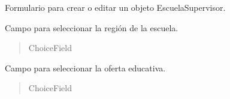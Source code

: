 \documentclass[letterpaper,10pt,spanish]{sphinxmanual}
\begin{document}
\begin{fulllineitems}

\pysigstartsignatures
{}
\pysigstopsignatures
\sphinxAtStartPar
Formulario para crear o editar un objeto EscuelaSupervisor.


\begin{fulllineitems}

\pysigstartsignatures
{}
\pysigstopsignatures
\sphinxAtStartPar
Campo para seleccionar la región de la escuela.
\begin{quote}\begin{description}
\sphinxAtStartPar
ChoiceField

\end{description}\end{quote}

\end{fulllineitems}



\begin{fulllineitems}

\pysigstartsignatures
{}
\pysigstopsignatures
\sphinxAtStartPar
Campo para seleccionar la oferta educativa.
\begin{quote}\begin{description}
\sphinxAtStartPar
ChoiceField

\end{description}\end{quote}


\end{fulllineitems}
\end{fulllineitems}
\end{document}
